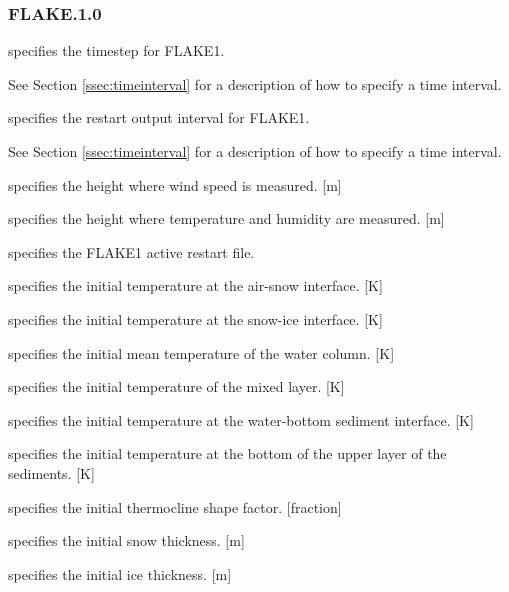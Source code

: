  
 \subsubsection{FLAKE.1.0} \label{sssec:flake.1.0}
 

 
  specifies the timestep for FLAKE1.

 See Section \ref{ssec:timeinterval} for a description
 of how to specify a time interval.

  specifies the restart output
 interval for FLAKE1.

 See Section \ref{ssec:timeinterval} for a description
 of how to specify a time interval.

  specifies the height
 where wind speed is measured. [m]

 specifies the height where temperature and humidity are measured. [m]

  specifies the FLAKE1 active restart file.

  specifies
 the initial temperature at the air-snow interface. [K]

  specifies
 the initial temperature at the snow-ice interface. [K]

  specifies
 the initial mean temperature of the water column. [K]

  specifies the
 initial temperature of the mixed layer. [K]

 specifies the initial temperature at the water-bottom sediment
 interface. [K]

 specifies the initial temperature at the bottom of the upper layer
 of the sediments. [K]

  specifies the
 initial thermocline shape factor. [fraction]

  specifies the
 initial snow thickness. [m]

  specifies the
 initial ice thickness. [m]

